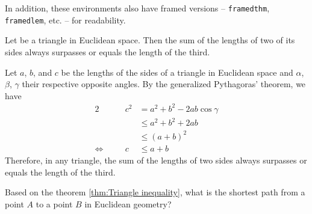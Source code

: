 \documentclass[a4paper, 12pt]{report}
\begin{document}
In addition, these environments also have framed versions -- \texttt{framedthm}, \texttt{framedlem}, etc. -- for readability.

\begin{framedthm}\label{thm:Triangle inequality}
	Let be a triangle in Euclidean space. Then the sum of the lengths of two of its sides always surpasses or equals the length of the third.
\end{framedthm}

\begin{framedprf}
	Let $a$, $b$, and $c$ be the lengths of the sides of a triangle in Euclidean space and $\alpha$, $\beta$, $\gamma$ their respective opposite angles. By the generalized Pythagoras' theorem, we have
	\begin{alignat*}{2}
		&  & c^2 & = a^2 + b^2 - 2ab \cos\gamma \\
		&  &     & \leq a^2 + b^2 + 2ab         \\
		&  &     & \leq (a + b)^2               \\
		\Leftrightarrow \quad &  & c   & \leq a + b
	\end{alignat*}
	Therefore, in any triangle, the sum of the lengths of two sides always surpasses or equals the length of the third. \qedadd
\end{framedprf}

\begin{framedquest*}
	Based on the theorem \ref{thm:Triangle inequality}, what is the shortest path from a point $A$ to a point $B$ in Euclidean geometry?
\end{framedquest*}

   

\end{document}
